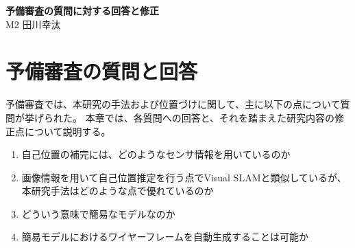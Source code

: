 \documentclass[]{jarticle}          %
\begin{document}

\vspace*{2ex}
\begin{center}
 {\Large \bf 予備審査の質問に対する回答と修正}\\ %
 \vspace*{5mm}
 {\large M2 田川幸汰}%
\end{center}






\section{予備審査の質問と回答}
予備審査では、本研究の手法および位置づけに関して、主に以下の点について質問が挙げられた。
本章では、各質問への回答と、それを踏まえた研究内容の修正点について説明する。

\begin{enumerate}
  \item 自己位置の補完には、どのようなセンサ情報を用いているのか
  \item 画像情報を用いて自己位置推定を行う点でVisual SLAMと類似しているが、本研究手法はどのような点で優れているのか
  \item どういう意味で簡易なモデルなのか
  \item 簡易モデルにおけるワイヤーフレームを自動生成することは可能か
\end{enumerate}
\end{document}

